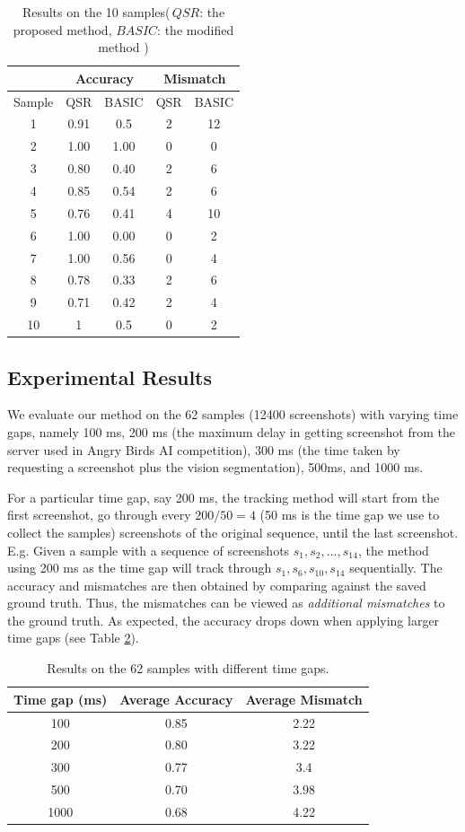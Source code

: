 \documentclass[letterpaper]{article}
\begin{document}
\begin{table}[h!]
\caption{Results on the 10 samples(\,$QSR$: the proposed method, $BASIC$: the modified method )}\label{empiResults}
\centering
\begin{tabular}{c|c|c|c|c}
\hline
{} & \multicolumn{2}{c}{Accuracy} & \multicolumn{2}{c}{Mismatch}\\
\hline
Sample & QSR & BASIC & QSR & BASIC \\
\hline
1& 0.91 & 0.5 & 2 & 12\\
2&1.00 & 1.00 & 0 & 0\\
3&0.80 & 0.40 & 2 & 6\\
4&0.85 & 0.54 & 2 & 6\\
5&0.76 & 0.41 & 4 & 10\\
6&1.00 & 0.00 & 0 & 2\\
7&1.00 & 0.56 & 0 & 4\\
8&0.78 & 0.33 & 2 & 6 \\
9&0.71 & 0.42 & 2 & 4\\
10&1 & 0.5 & 0 & 2\\
\hline
\end{tabular}
\end{table}

\subsection{Experimental Results}

We evaluate our method on the 62 samples (12400 screenshots) with varying time gaps, namely 100 ms, 200 ms (the maximum delay in getting screenshot from the server used in Angry Birds AI competition), 300 ms (the time taken by requesting a screenshot plus the vision segmentation), 500ms, and 1000 ms.

For a particular time gap, say 200 ms, the tracking method will start from the first screenshot, go through every $200/50 = 4$ (50 ms is the time gap we use to collect the samples) screenshots of the original sequence, until the last screenshot. E.g. Given a sample with a sequence of screenshots $s_1, s_2, ..., s_{14}$, the method using 200 ms as the time gap will track through $s_1, s_6, s_{10}, s_{14}$ sequentially. The accuracy and mismatches are then obtained by comparing against the saved ground truth. Thus, the mismatches can be viewed as \emph{additional mismatches} to the ground truth. As expected, the accuracy drops down when applying larger time gaps (see Table \ref{empiResults_2}). 

\begin{table}[h!]
\caption{Results on the 62 samples with different time gaps. }\label{empiResults_2}
\centering
\begin{tabular}{c|c|c}
\hline
Time gap (ms) & Average Accuracy & Average Mismatch\\
\hline
100 & 0.85 & 2.22\\
200 & 0.80 & 3.22\\
300 & 0.77 & 3.4\\
500 & 0.70 & 3.98\\
1000 & 0.68 & 4.22\\
\hline
\end{tabular}
\end{table}
\end{document}
